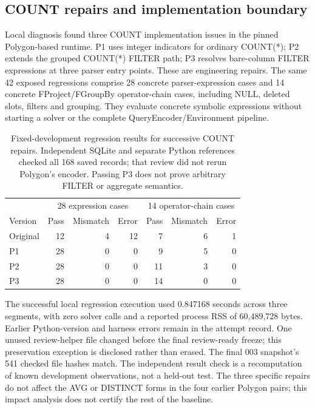\subsection{COUNT repairs and implementation boundary}\label{sec:diagnosticimplementation}
Local diagnosis found three COUNT implementation issues in the pinned Polygon-based runtime. P1 uses integer indicators for ordinary COUNT(*); P2 extends the grouped COUNT(*) FILTER path; P3 resolves bare-column FILTER expressions at three parser entry points. These are engineering repairs. The same 42 exposed regressions comprise 28 concrete parser-expression cases and 14 concrete FProject/FGroupBy operator-chain cases, including NULL, deleted slots, filters and grouping. They evaluate concrete symbolic expressions without starting a solver or the complete QueryEncoder/Environment pipeline.

\begin{table}[htbp]
\centering\small
\begin{tabular}{l rrr rrr}
\toprule
 & \multicolumn{3}{c}{28 expression cases} & \multicolumn{3}{c}{14 operator-chain cases}\\
Version & Pass & Mismatch & Error & Pass & Mismatch & Error\\
\midrule
Original & 12 & 4 & 12 & 7 & 6 & 1\\
P1 & 28 & 0 & 0 & 9 & 5 & 0\\
P2 & 28 & 0 & 0 & 11 & 3 & 0\\
P3 & 28 & 0 & 0 & 14 & 0 & 0\\
\bottomrule
\end{tabular}
\caption{Fixed-development regression results for successive COUNT repairs. Independent SQLite and separate Python references checked all 168 saved records; that review did not rerun Polygon's encoder. Passing P3 does not prove arbitrary FILTER or aggregate semantics.}\label{tab:countrepair}
\end{table}

The successful local regression execution used 0.847168 seconds across three segments, with zero solver calls and a reported process RSS of 60,489,728 bytes. Earlier Python-version and harness errors remain in the attempt record. One unused review-helper file changed before the final review-ready freeze; this preservation exception is disclosed rather than erased. The final 003 snapshot's 541 checked file hashes match. The independent result check is a recomputation of known development observations, not a held-out test. The three specific repairs do not affect the AVG or DISTINCT forms in the four earlier Polygon pairs; this impact analysis does not certify the rest of the baseline.

